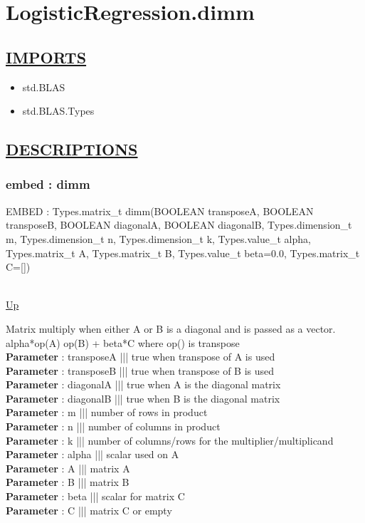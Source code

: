 \chapter*{LogisticRegression.dimm}
\hypertarget{LogisticRegression.dimm}{}

\section*{\underline{IMPORTS}}
\begin{itemize}
\item std.BLAS
\item std.BLAS.Types
\end{itemize}

\section*{\underline{DESCRIPTIONS}}
\subsection*{embed : dimm}
\hypertarget{ecldoc:logisticregression.dimm}{EMBED : Types.matrix\_t dimm(BOOLEAN transposeA, BOOLEAN transposeB, BOOLEAN diagonalA, BOOLEAN diagonalB, Types.dimension\_t m, Types.dimension\_t n, Types.dimension\_t k, Types.value\_t alpha, Types.matrix\_t A, Types.matrix\_t B, Types.value\_t beta=0.0, Types.matrix\_t C=[])} \\
\hyperlink{ecldoc:}{Up} \\
\par
Matrix multiply when either A or B is a diagonal and is passed as a vector. alpha*op(A) op(B) + beta*C where op() is transpose \\
\textbf{Parameter} : transposeA ||| true when transpose of A is used \\
\textbf{Parameter} : transposeB ||| true when transpose of B is used \\
\textbf{Parameter} : diagonalA ||| true when A is the diagonal matrix \\
\textbf{Parameter} : diagonalB ||| true when B is the diagonal matrix \\
\textbf{Parameter} : m ||| number of rows in product \\
\textbf{Parameter} : n ||| number of columns in product \\
\textbf{Parameter} : k ||| number of columns/rows for the multiplier/multiplicand \\
\textbf{Parameter} : alpha ||| scalar used on A \\
\textbf{Parameter} : A ||| matrix A \\
\textbf{Parameter} : B ||| matrix B \\
\textbf{Parameter} : beta ||| scalar for matrix C \\
\textbf{Parameter} : C ||| matrix C or empty \\

